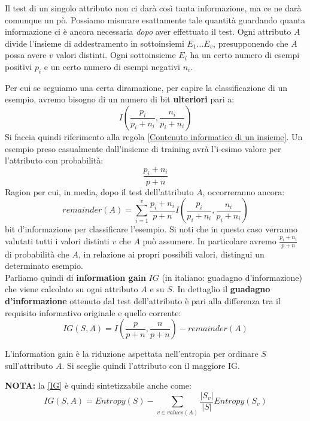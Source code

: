 Il test di un singolo attributo non ci darà così tanta informazione, ma ce ne darà comunque un pò. Possiamo misurare esattamente tale quantità guardando quanta informazione ci è ancora necessaria \textit{dopo} aver effettuato il test. Ogni attributo $A$ divide l'insieme di addestramento in sottoinsiemi $E_1\dots E_v$, presupponendo che $A$ possa avere $v$ valori distinti. Ogni sottoinsieme $E_i$ ha un certo numero di esempi positivi $p_i$ e un certo numero di esempi negativi $n_i$. \\
\begin{figure}[H]
  \centering
\end{figure}
Per cui se seguiamo una certa diramazione, per capire la classificazione di un esempio, avremo bisogno di un numero di bit \textbf{ulteriori} pari a:
\[I\left(\frac{p_i}{p_i+n_i},\frac{n_i}{p_i+n_i}\right)\]
Si faccia quindi riferimento alla regola \ref{Contenuto informatico di un insieme}. Un esempio preso casualmente dall'insieme di training avrà l'i-esimo valore per l'attributo con probabilità:
\[\frac{p_i+n_i}{p+n}\]
Ragion per cui, in media, dopo il test dell'attributo $A$, occorreranno ancora:
\begin{equation}
\label{IG Attributo}
remainder(A)=\sum_{i=1}^v \frac{p_i+n_i}{p+n}
  I\left(\frac{p_i}{p_i+n_i},\frac{n_i}{p_i+n_i}\right)
    \end{equation}
bit d'informazione per classificare l'esempio. Si noti che in questo caso verranno valutati tutti i valori distinti $v$ che $A$ può assumere. In particolare avremo $\frac{p_i+n_i}{p+n}$ di probabilità che $A$, in relazione ai propri possibili valori, distingui un determinato esempio.\\
Parliamo quindi di \textbf{information gain} $IG$ (in italiano: guadagno d'informazione) che viene calcolato su ogni
attributo $A$ e su $S$. In dettaglio il \textbf{guadagno d'informazione} ottenuto dal test dell'attributo è pari alla differenza tra il requisito informativo originale e quello corrente:
\begin{equation}
\label{IG}
IG(S, A)=I\left(\frac{p}{p+n},\frac{n}{p+n}\right)-remainder(A)
\end{equation}
\begin{definizione}
L'information gain è la riduzione aspettata nell'entropia per ordinare $S$ sull'attributo $A$. Si sceglie quindi l'attributo con il maggiore IG. 
\end{definizione} 
\textbf{NOTA:} la \ref{IG} è quindi sintetizzabile anche come:
\begin{equation}
\label{IG2}
IG(S, A)=Entropy(S)-\sum_{v\in values(A)}\frac{|S_v|}{|S|}Entropy(S_v)
    \end{equation}

